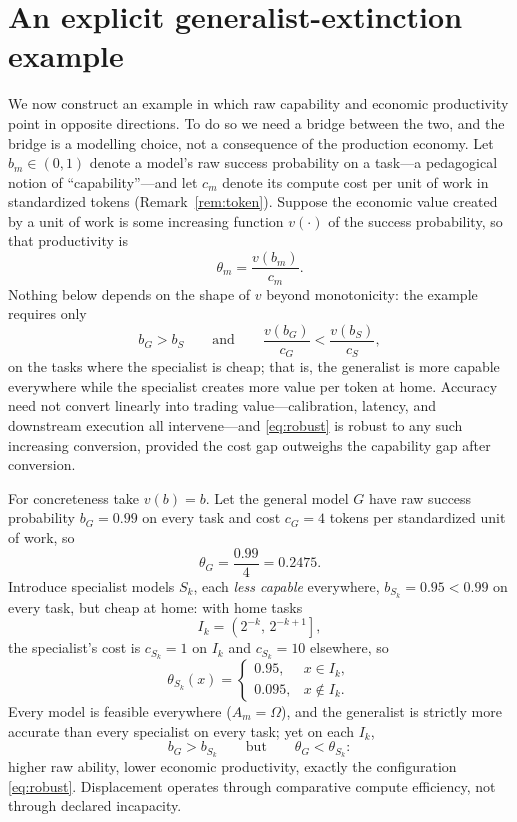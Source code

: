 \documentclass[11pt]{article}
\theoremstyle{definition}
\theoremstyle{remark}
\begin{document}
\section{An explicit generalist-extinction example}
\label{sec:extinction}

We now construct an example in which raw capability and economic productivity point in opposite directions. To do so we need a bridge between the two, and the bridge is a modelling choice, not a consequence of the production economy. Let $b_m \in (0,1)$ denote a model's raw success probability on a task---a pedagogical notion of ``capability''---and let $c_m$ denote its compute cost per unit of work in standardized tokens (Remark~\ref{rem:token}). Suppose the economic value created by a unit of work is some increasing function $v(\cdot)$ of the success probability, so that productivity is
\begin{equation}
\label{eq:bridge}
\theta_m = \frac{v(b_m)}{c_m}.
\end{equation}
Nothing below depends on the shape of $v$ beyond monotonicity: the example requires only
\begin{equation}
\label{eq:robust}
b_G > b_S
\qquad\text{and}\qquad
\frac{v(b_G)}{c_G} < \frac{v(b_S)}{c_S},
\end{equation}
on the tasks where the specialist is cheap; that is, the generalist is more capable everywhere while the specialist creates more value per token at home. Accuracy need not convert linearly into trading value---calibration, latency, and downstream execution all intervene---and \eqref{eq:robust} is robust to any such increasing conversion, provided the cost gap outweighs the capability gap after conversion.

For concreteness take $v(b) = b$. Let the general model $G$ have raw success probability $b_G = 0.99$ on every task and cost $c_G = 4$ tokens per standardized unit of work, so
\begin{equation}
\theta_G = \frac{0.99}{4} = 0.2475.
\end{equation}
Introduce specialist models $S_k$, each \emph{less capable} everywhere, $b_{S_k} = 0.95 < 0.99$ on every task, but cheap at home: with home tasks
\begin{equation}
I_k = \left( 2^{-k},\, 2^{-k+1} \right],
\end{equation}
the specialist's cost is $c_{S_k} = 1$ on $I_k$ and $c_{S_k} = 10$ elsewhere, so
\begin{equation}
\theta_{S_k}(x) =
\begin{cases}
0.95, & x \in I_k,\\
0.095, & x \notin I_k.
\end{cases}
\end{equation}
Every model is feasible everywhere ($A_m = \Omega$), and the generalist is strictly more accurate than every specialist on every task; yet on each $I_k$,
\begin{equation}
b_G > b_{S_k}
\qquad \text{but} \qquad
\theta_G < \theta_{S_k}:
\end{equation}
higher raw ability, lower economic productivity, exactly the configuration \eqref{eq:robust}. Displacement operates through comparative compute efficiency, not through declared incapacity.
\end{document}
